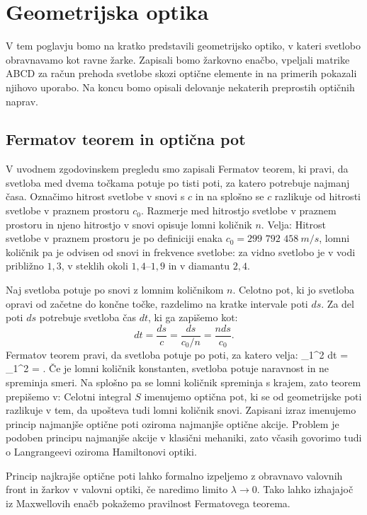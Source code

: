 
\chapter{Geometrijska optika}
V tem poglavju bomo na kratko predstavili geometrijsko optiko,
v kateri svetlobo obravnavamo kot ravne žarke. Zapisali bomo
žarkovno enačbo, vpeljali matrike ABCD za račun prehoda svetlobe
skozi optične elemente in na
primerih pokazali njihovo uporabo. Na koncu bomo opisali 
delovanje nekaterih preprostih optičnih naprav. 

\section{Fermatov teorem in optična pot}
V uvodnem zgodovinskem pregledu smo zapisali Fermatov teorem, 
ki pravi, da svetloba med dvema točkama potuje po tisti poti, 
za katero potrebuje najmanj časa. Označimo
hitrost svetlobe v snovi s $c$ in na splošno se  $c$ razlikuje
od hitrosti svetlobe v praznem prostoru $c_0$. Razmerje med
hitrostjo svetlobe v praznem prostoru in njeno hitrostjo
v snovi opisuje lomni količnik $n$. Velja:
Hitrost svetlobe v praznem prostoru je
po definiciji enaka $c_0 = 299\,\,792\,\,458~\si{m/s}$, 
lomni količnik pa je odvisen od snovi in frekvence svetlobe: za vidno svetlobo
je v vodi približno $1,3$, v steklih okoli $1,4$--$1,9$ in v diamantu $2,4$.

Naj svetloba potuje po snovi z lomnim količnikom $n$. Celotno pot, ki 
jo svetloba opravi od začetne do končne točke, razdelimo na kratke intervale 
poti $ds$. Za del poti $ds$ potrebuje svetloba čas $dt$, ki ga zapišemo kot:
\begin{equation}
 dt = \frac{ds}{c} = \frac{ds}{c_0/n} = \frac{nds}{c_0}.
\label{eq:02_02}
\end{equation}
Fermatov teorem pravi, da svetloba potuje po poti, za katero velja:
\beq
\int_1^2 dt = \int_1^2  = .
\label{eq:02_03}
\eeq
Če je lomni količnik konstanten, svetloba potuje naravnost in 
ne spreminja smeri. Na splošno pa se lomni količnik spreminja s 
krajem, zato teorem prepišemo v:
Celotni integral $S$ imenujemo optična pot, ki se od geometrijske poti razlikuje v tem,
da upošteva tudi lomni količnik snovi. 
Zapisani izraz imenujemo princip najmanjše optične poti oziroma najmanjše optične akcije. 
Problem je podoben principu najmanjše akcije v klasični mehaniki, zato včasih govorimo  
tudi o Langrangeevi oziroma Hamiltonovi optiki.
\begin{remark}
Princip najkrajše optične poti lahko formalno izpeljemo z 
obravnavo valovnih front in žarkov v valovni optiki, če naredimo limito $\lambda \to 0$.
Tako lahko izhajajoč iz Maxwellovih enačb pokažemo pravilnost Fermatovega teorema.
\end{remark}

